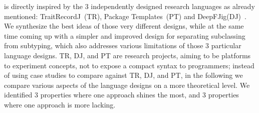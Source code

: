 \name is directly inspired by the $3$ independently designed research languages as already mentioned:
 TraitRecordJ~(TR)\cite{Bettini:2010:ISP:1774088.1774530}, Package Templates~(PT)\cite{KrogdahlMS09} and DeepFJig(DJ)~\cite{deep}.
We synthesize
the best ideas of those very different designs, while at the same time 
coming up with a simpler and improved design for separating
subclassing from subtyping, which also addresses various limitations of those
$3$ particular language designs.
TR, DJ, and PT are research projects, aiming to 
be platforms to experiment concepts, not to expose a compact syntax to programmers;
instead of using case studies to compare \name against TR, DJ, and PT,
in the following we compare 
various aspects of the language designs on a more theoretical level.
We identified $3$ properties where one approach shines the most,
 and $3$ properties where one approach is more lacking.
